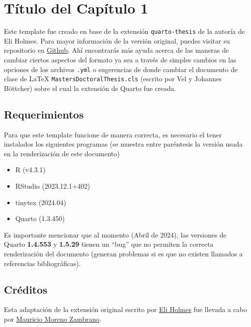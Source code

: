 \documentclass[
  letterpaper,
  11pt,
  spanish,
  singlespacing,
  headsepline]{MastersDoctoralThesis}
\providecommand{\tightlist}{%
  \setlength{\itemsep}{0pt}\setlength{\parskip}{0pt}}\usepackage{longtable,booktabs,array}
\begin{document}

\hypertarget{sec-Chapter1}{%
\chapter{Título del Capítulo 1}\label{sec-Chapter1}}

Este template fue creado en base de la extensión \texttt{quarto-thesis}
de la autoría de Eli Holmes. Para mayor información de la versión
original, puedes visitar su repositorio en
\href{https://github.com/nmfs-opensci/quarto-thesis}{Github}. Ahí
encontrarás más ayuda acerca de las maneras de cambiar ciertos aspectos
del formato ya sea a través de simples cambios en las opciones de los
archivos \texttt{.yml} o sugerencias de donde cambiar el documento de
clase de \LaTeX{} \texttt{MastersDoctoralThesis.cls} (escrito por Vel y
Johannes Böttcher) sobre el cual la extensión de Quarto fue creada.

\hypertarget{requerimientos}{%
\section{Requerimientos}\label{requerimientos}}

Para que este template funcione de manera correcta, es necesario el
tener instalados los siguientes programas (se muestra entre paréntesis
la versión usada en la renderización de este documento)

\begin{itemize}
\tightlist
\item
  R (v4.3.1)
\item
  RStudio (2023.12.1+402)
\item
  tinytex (2024.04)
\item
  Quarto (1.3.450)
\end{itemize}

Es importante mencionar que al momento (Abril de 2024), las versiones de
Quarto \textbf{1.4.553} y \textbf{1.5.29} tienen un ``bug'' que no
permiten la correcta renderización del documento (generan problemas si
es que no existen llamados a referencias bibliográficas).

\hypertarget{cruxe9ditos}{%
\section{Créditos}\label{cruxe9ditos}}

Esta adaptación de la extensión original escrito por
\href{https://eeholmes.github.io}{Eli Holmes} fue llevada a cabo por
\href{https://mmorenozam.netlify.app/}{Mauricio Moreno Zambrano}.
\end{document}
